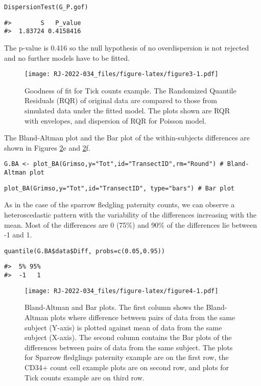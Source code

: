 \begin{verbatim}
DispersionTest(G_P.gof)
\end{verbatim}

\begin{verbatim}
#>        S   P_value
#>  1.83724 0.4158416
\end{verbatim}

The p-value is 0.416 so the null hypothesis of no overdispersion is not rejected and no further models have to be fitted.

\begin{figure}
\centering
\texttt{[image: RJ-2022-034\_files/figure-latex/figure3-1.pdf]}
\caption{\label{fig:figure3}Goodness of fit for Tick counts example. The Randomized Quantile Residuals (RQR) of original data are compared to those from simulated data under the fitted model. The plots shown are RQR with envelopes, and dispersion of RQR for Poisson model.}
\end{figure}

The Bland-Altman plot and the Bar plot of the within-subjects differences are shown in Figures \ref{fig:figure4}e and \ref{fig:figure4}f.

\begin{verbatim}
G.BA <- plot_BA(Grimso,y="Tot",id="TransectID",rm="Round") # Bland-Altman plot
\end{verbatim}

\begin{verbatim}
plot_BA(Grimso,y="Tot",id="TransectID", type="bars") # Bar plot
\end{verbatim}

As in the case of the sparrow fledgling paternity counts, we can observe a heteroscedastic pattern with the variability of the differences increasing with the mean. Most of the differences are 0 (75\%) and 90\% of the differences lie between -1 and 1.

\begin{verbatim}
quantile(G.BA$data$Diff, probs=c(0.05,0.95))
\end{verbatim}

\begin{verbatim}
#>  5% 95% 
#>  -1   1
\end{verbatim}

\begin{figure}
\centering
\texttt{[image: RJ-2022-034\_files/figure-latex/figure4-1.pdf]}
\caption{\label{fig:figure4}Bland-Altman and Bar plots. The first column shows the Bland-Altman plots where difference between pairs of data from the same subject (Y-axis) is plotted against mean of data from the same subject (X-axis). The second column contains the Bar plots of the differences between pairs of data from the same subject. The plots for Sparrow fledglings paternity example are on the first row, the CD34+ count cell example plots are on second row, and plots for Tick counts example are on third row.}
\end{figure}

